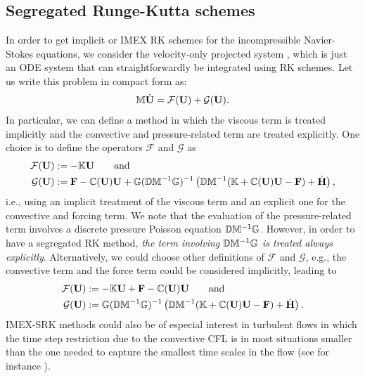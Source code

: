 \subsection{Segregated Runge-Kutta schemes}

In order to get implicit or IMEX RK schemes for the incompressible Navier-Stokes equations, we consider the velocity-only projected system , which is just an ODE system that can straightforwardly be integrated using RK schemes. Let us write this problem in compact form as:
\begin{equation}
\label{eq-C6_NS_galerkin_mat1_ope}
\mathbb{M}\dot{{\bf U}}=\mathcal{F}({\bf U})+\mathcal{G}({\bf U}).
\end{equation}
In particular, we can define a method in which the viscous term is treated implicitly and the convective and pressure-related term are treated explicitly. One choice is to define the operators $\mathcal{F}$ and $\mathcal{G}$ as 
\begin{align}
\label{eq-C6_oper_def}
\mathcal{F}({\bf U}) &:=-\mathbb{K}{\bf U}\quad\quad\mbox{and}\\
 \mathcal{G}({\bf U})&:= 
 {\bf F} - \mathbb{C}({\bf U}){\bf U} + \mathbb{G}(\mathbb{D}\mathbb{M}^{-1}\mathbb{G})^{-1} \left( \mathbb{D}\mathbb{M}^{-1}(\mathbb{K}+\mathbb{C}({\bf U}){\bf U} - {\bf F})+ \dot{\bf{H}} \right),
\end{align}
i.e., using an implicit treatment of the viscous term and an explicit one for the convective and forcing term. We note that the evaluation of the pressure-related term involves a discrete pressure Poisson equation $\mathbb{D}\mathbb{M}^{-1}\mathbb{G}$.  However, in order to have a segregated RK method, \emph{the term involving $\mathbb{D}\mathbb{M}^{-1}\mathbb{G}$ is treated always explicitly}. Alternatively, we could choose other definitions of $\mathcal{F}$ and $\mathcal{G}$, e.g., %
the convective term and the force term could be considered implicitly, leading to 
\begin{align}
\label{eq-C6_oper_def2}
\mathcal{F}({\bf U}) &:=-\mathbb{K}{\bf U} + {\bf F} - \mathbb{C}({\bf U}){\bf U} \quad\quad\mbox{and}\\
 \mathcal{G}({\bf U})&:=  \mathbb{G}(\mathbb{D}\mathbb{M}^{-1}\mathbb{G})^{-1} \left( \mathbb{D}\mathbb{M}^{-1}(\mathbb{K}+\mathbb{C}({\bf U}){\bf U} - {\bf F})+ \dot{\bf{H}} \right).
\end{align} 
IMEX-SRK methods could also be of especial interest in turbulent flows in which the time step restriction due to the convective CFL is in most situations smaller than the one needed to capture the smallest time scales in the flow (see for instance \cite{verstappen_symmetry-preserving_2003,vreman_comparison_2014}). 

